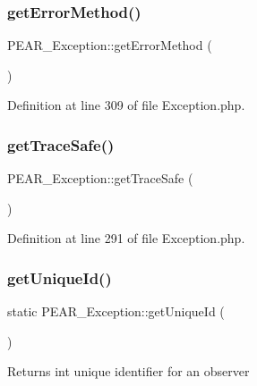 \subsubsection{\texorpdfstring{get\+Error\+Method()}{getErrorMethod()}}
{\footnotesize\ttfamily P\+E\+A\+R\+\_\+\+Exception\+::get\+Error\+Method (\begin{DoxyParamCaption}{ }\end{DoxyParamCaption})}



Definition at line 309 of file Exception.\+php.

\hypertarget{classPEAR__Exception_a6ddfe3065ec2af986b3e3fe267198515}{}\label{classPEAR__Exception_a6ddfe3065ec2af986b3e3fe267198515} 
\subsubsection{\texorpdfstring{get\+Trace\+Safe()}{getTraceSafe()}}
{\footnotesize\ttfamily P\+E\+A\+R\+\_\+\+Exception\+::get\+Trace\+Safe (\begin{DoxyParamCaption}{ }\end{DoxyParamCaption})}



Definition at line 291 of file Exception.\+php.

\hypertarget{classPEAR__Exception_af81b4e556fe7142e45ed9117b8cfb044}{}\label{classPEAR__Exception_af81b4e556fe7142e45ed9117b8cfb044} 
\subsubsection{\texorpdfstring{get\+Unique\+Id()}{getUniqueId()}}
{\footnotesize\ttfamily static P\+E\+A\+R\+\_\+\+Exception\+::get\+Unique\+Id (\begin{DoxyParamCaption}{ }\end{DoxyParamCaption})\hspace{0.3cm}{\ttfamily [static]}}

\begin{DoxyReturn}{Returns}
int unique identifier for an observer 
\end{DoxyReturn}


